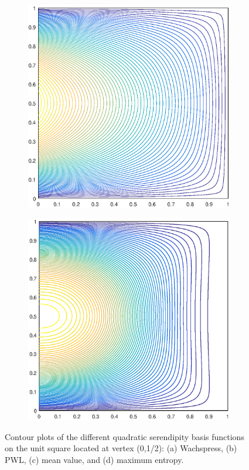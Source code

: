 \documentclass[11pt]{article}
\begin{document}
\begin{figure}
\begin{subfigure}[b]{0.25\textwidth}
		\caption{}
	\end{subfigure}
	\vfill
	\begin{subfigure}[b]{0.25\textwidth}
		\centering
		\includegraphics[width=\textwidth]{figures/square_MV2_contour_b8.eps}
		\caption{}
	\end{subfigure}
	\hspace{1cm}
	\begin{subfigure}[b]{0.25\textwidth}
		\centering
		\includegraphics[width=\textwidth]{figures/square_MAXENT2_contour_b8.eps}
		\caption{}
	\end{subfigure}
\caption{Contour plots of the different quadratic serendipity basis functions on the unit square located at vertex (0,1/2): (a) Wachspress, (b) PWL, (c) mean value, and (d) maximum entropy.}
\end{figure}
\end{document}
